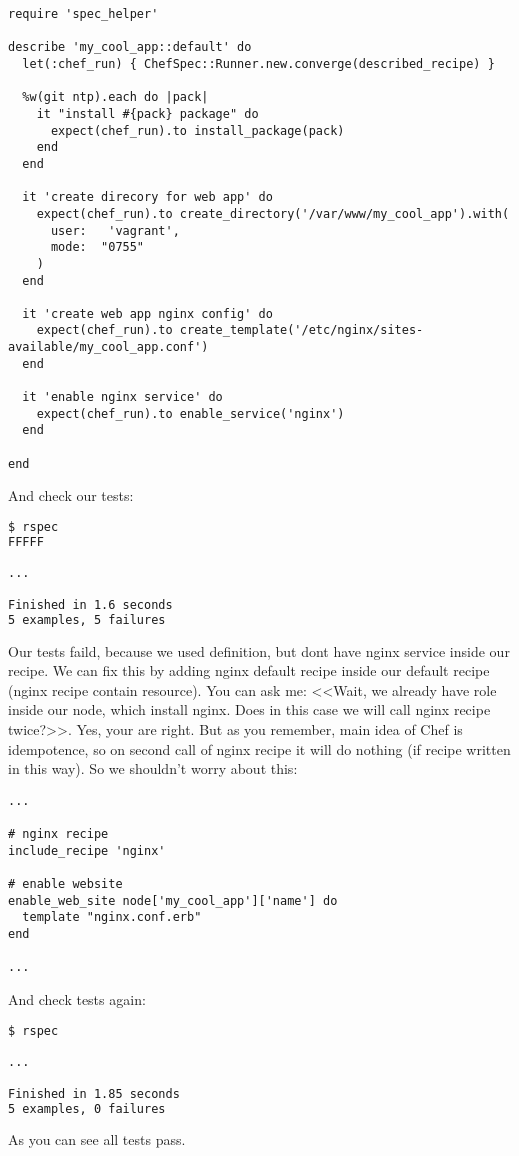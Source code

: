 \begin{lstlisting}[label=lst:testing-chefspec3,title=my-server-cloud/site-cookbooks/my\_cool\_app/spec/unit/recipes/default\_spec.rb]
require 'spec_helper'

describe 'my_cool_app::default' do
  let(:chef_run) { ChefSpec::Runner.new.converge(described_recipe) }

  %w(git ntp).each do |pack|
    it "install #{pack} package" do
      expect(chef_run).to install_package(pack)
    end
  end

  it 'create direcory for web app' do
    expect(chef_run).to create_directory('/var/www/my_cool_app').with(
      user:   'vagrant',
      mode:  "0755"
    )
  end

  it 'create web app nginx config' do
    expect(chef_run).to create_template('/etc/nginx/sites-available/my_cool_app.conf')
  end

  it 'enable nginx service' do
    expect(chef_run).to enable_service('nginx')
  end

end
\end{lstlisting}

And check our tests:

\begin{lstlisting}[language=Bash,label=lst:testing-chefspec5]
$ rspec
FFFFF

...

Finished in 1.6 seconds
5 examples, 5 failures
\end{lstlisting}

Our tests faild, because we used  definition, but dont have nginx service inside our recipe. We can fix this by adding nginx default recipe inside our default recipe (nginx recipe contain  resource). You can ask me: <<Wait, we already have role  inside our node, which install nginx. Does in this case we will call nginx recipe twice?>>. Yes, your are right. But as you remember, main idea of Chef is idempotence, so on second call of nginx recipe it will do nothing (if recipe written in this way). So we shouldn't worry about this:

\begin{lstlisting}[label=lst:testing-chefspec6,title=my-server-cloud/site-cookbooks/my\_cool\_app/recipes/default.rb]
...

# nginx recipe
include_recipe 'nginx'

# enable website
enable_web_site node['my_cool_app']['name'] do
  template "nginx.conf.erb"
end

...
\end{lstlisting}

And check tests again:

\begin{lstlisting}[language=Bash,label=lst:testing-chefspec7]
$ rspec

...

Finished in 1.85 seconds
5 examples, 0 failures
\end{lstlisting}

As you can see all tests pass.